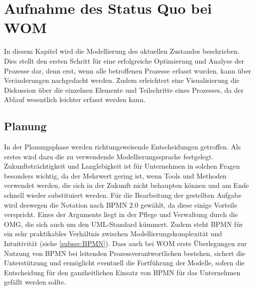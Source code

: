 \documentclass[a4paper,12pt]{report}
\begin{document}
\chapter{Aufnahme des Status Quo bei WOM}\label{chap:AufnahmeStatusQuo}
In diesem Kapitel wird die Modellierung des aktuellen Zustandes beschrieben. Dies stellt den ersten Schritt für eine erfolgreiche Optimierung und Analyse der Prozesse dar, denn erst, wenn alle betroffenen Prozesse erfasst wurden, kann über Veränderungen nachgedacht werden. Zudem erleichtert eine Visualisierung die Diskussion über die einzelnen Elemente und Teilschritte eines Prozesses, da der Ablauf wesentlich leichter erfasst werden kann.
\section{Planung}\label{sec:Planung}
In der Planungsphase werden richtungsweisende Entscheidungen getroffen. Als erstes wird dazu die zu verwendende Modellierungssprache festgelegt. Zukunftsträchtigkeit und Langlebigkeit ist für Unternehmen in solchen Fragen besonders wichtig, da der Mehrwert gering ist, wenn Tools und Methoden verwendet werden, die sich in der Zukunft nicht behaupten können und am Ende schnell wieder substituiert werden. Für die Bearbeitung der gestellten Aufgabe wird deswegen die Notation nach BPMN 2.0 gewählt, da diese einige Vorteile verspricht. Eines der Argumente liegt in der Pflege und Verwaltung durch die \ac{OMG}, die sich auch um den UML-Standard kümmert. Zudem steht BPMN für ein sehr praktikables Verhältnis zwischen Modellierungskomplexität und Intuitivität (siehe \ref{subsec:BPMN}). Dass auch bei WOM erste Überlegungen zur Nutzung von BPMN bei leitenden Prozessverantwortlichen bestehen, sichert die Unterstützung und ermöglicht eventuell die Fortführung der Modelle, sofern die Entscheidung für den ganzheitlichen Einsatz von BPMN für das Unternehmen gefällt werden sollte.
\end{document}
